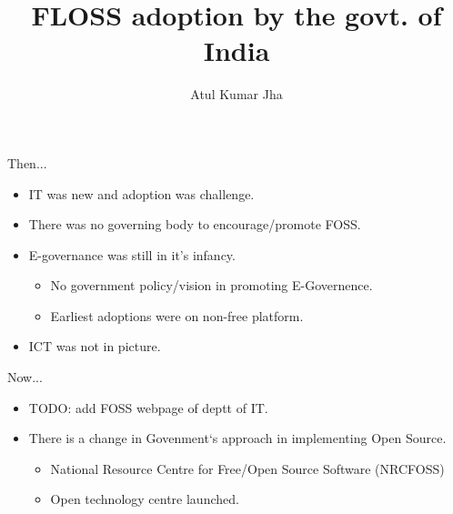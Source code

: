 \documentclass{beamer}
\author{Atul Kumar Jha}
\title{FLOSS adoption by the govt. of India}
\institute{CSS Corp. India }
\begin{document}
	\begin{frame}{}
	\titlepage
	\end{frame}
        \begin{frame}{Then...}
                \begin{itemize}[<+->]
                          \item IT was new and adoption was challenge.
                          \item There was no governing body to encourage/promote FOSS.
                          \item E-governance was still in it's infancy.
                                \begin{itemize}
                                    \item No government policy/vision in promoting E-Governence.
                                     \item Earliest adoptions were on non-free platform.
                                 \end{itemize}
                          \item ICT was not in picture.
                \end{itemize}
        \end{frame}
        \begin{frame}{Now...}
                  \begin{itemize}[<+->]
                      \item TODO: add FOSS webpage of deptt of IT. %
                      \item There is a change in Govenment`s approach in implementing Open Source.
                            \begin{itemize}
                                \item National Resource Centre for Free/Open Source Software (NRCFOSS) %
                                \item Open technology centre launched.%
                             \end{itemize}
                      \end{itemize}
        \end{frame} 
\end{document}
